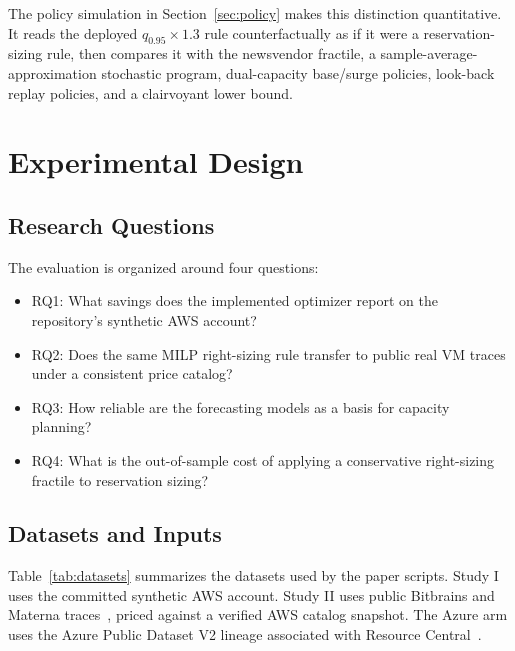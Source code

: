 \documentclass[conference]{IEEEtran}
\begin{document}
The policy simulation in Section~\ref{sec:policy} makes this distinction
quantitative. It reads the deployed $q_{0.95}\times1.3$ rule counterfactually
as if it were a reservation-sizing rule, then compares it with the newsvendor
fractile, a sample-average-approximation stochastic program, dual-capacity
base/surge policies, look-back replay policies, and a clairvoyant lower bound.

\section{Experimental Design}

\subsection{Research Questions}
The evaluation is organized around four questions:
\begin{itemize}
\item RQ1: What savings does the implemented optimizer report on the
repository's synthetic AWS account?
\item RQ2: Does the same MILP right-sizing rule transfer to public real VM
traces under a consistent price catalog?
\item RQ3: How reliable are the forecasting models as a basis for capacity
planning?
\item RQ4: What is the out-of-sample cost of applying a conservative
right-sizing fractile to reservation sizing?
\end{itemize}

\subsection{Datasets and Inputs}
Table~\ref{tab:datasets} summarizes the datasets used by the paper scripts.
Study I uses the committed synthetic AWS account. Study II uses public
Bitbrains and Materna traces~\cite{shen2015bitbrains,iosup2008gwa}, priced
against a verified AWS catalog snapshot. The Azure arm uses the Azure Public
Dataset V2 lineage associated with Resource Central~\cite{cortez2017resource}.
\end{document}
